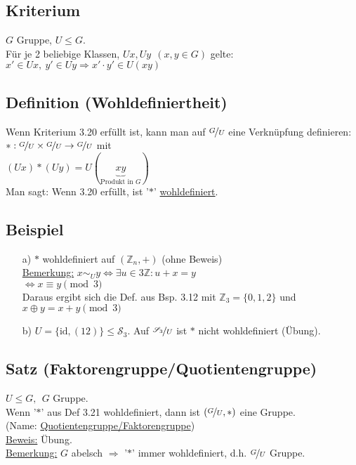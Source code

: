 \documentclass[12pt,titlepage, pdf]{article}
\newcommand{\f}[2]{\nicefrac{#1}{#2}}
\newcommand{\uline}[1]{\underline{#1}}
\newcommand{\id}{\textrm{id}}
\renewcommand{\>}{\rightarrow}
\renewcommand{\*}{\cdot}
\begin{document}
\subsection{Kriterium}
$G$ Gruppe, $U \leq G$.\\ Für je 2 beliebige Klassen, $Ux, Uy ~~(x,y \in G)$ gelte: \\
$x' \in Ux, ~y' \in Uy \Rightarrow x' \cdot y' \in U(xy)$
\subsection{Definition (Wohldefiniertheit)}
Wenn Kriterium 3.20 erfüllt ist, kann man auf $\f{G}{U}$ eine Verknüpfung definieren: \\
$\ast: \f{G}{U} \times \f{G}{U} \rightarrow \f{G}{U}$ mit \\
$(Ux) \ast (Uy) = U(\underbrace{xy}_{\text{Produkt in $G$}})$\\
Man sagt: Wenn 3.20 erfüllt, ist '$\ast$' \uline{wohldefiniert}.
\subsection{Beispiel}
\begin{itemize}
	\item[a)] $\ast$ wohldefiniert auf $(\mathds{Z}_n, +)$ (ohne Beweis) \\
	\uline{Bemerkung:} $x \sim_U y \Leftrightarrow \exists u \in 3 \mathds{Z}: u +x = y $\\
	 \noindent\hspace*{34.5mm}$\Leftrightarrow x \equiv y \pmod{3}$ \\
	Daraus ergibt sich die Def. aus Bsp. 3.12 mit $\mathds{Z}_3 = \{0,1,2\}$ und $x \oplus y = x +y \pmod{3}$
	\item[b)] $U = \{\id, (12)\} \leq \mathscr{S}_3$. Auf $\f{\mathscr{S}_3}{U}$ ist $\ast$ nicht wohldefiniert (Übung).
\end{itemize}
\subsection{Satz (Faktorengruppe/Quotientengruppe)}
$U \leq G,~~G$ Gruppe.\\ Wenn '$\ast$' aus Def 3.21 wohldefiniert, dann ist $(\f{G}{U}, \ast)$ eine Gruppe. \\ (Name: \uline{Quotientengruppe/Faktorengruppe}) \\
\uline{Beweis:} Übung. \\
\uline{Bemerkung:} $G$ abelsch $\Rightarrow$ '$\ast$' immer wohldefiniert, d.h.
$\f{G}{U}$ Gruppe.
\end{document}
